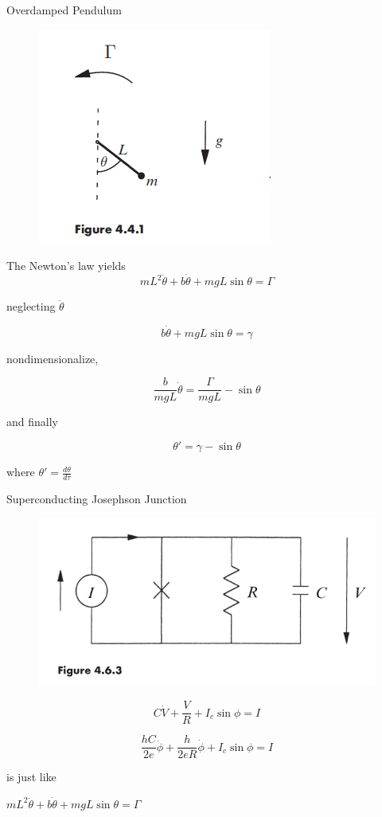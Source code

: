 \documentclass[9pt,aspectratio=43,mathserif,table]{beamer}
\begin{document}
\begin{frame}{Overdamped Pendulum}

  \begin{multicols}{2}
    \begin{figure}[!h]
      \centering
      \includegraphics[width=.2\textwidth]{fig/4.4.1.png}
    \end{figure}
    The Newton's law yields
    $$m L^2 \ddot \theta + b \dot\theta + mgL\sin\theta = \Gamma$$

    neglecting $\ddot\theta$

    $$b\dot \theta+ mgL\sin\theta = \gamma$$

    nondimensionalize, 

    $$\frac{ b}{mgL}\dot\theta = \frac{ \Gamma}{mgL} - \sin\theta$$

    and finally 

    $$\theta' = \gamma - \sin\theta$$

    where $\theta' = \frac{ d\theta}{d\tau}$
  \end{multicols}
 
\end{frame}
\begin{frame}{Superconducting Josephson Junction}
    \begin{figure}[!h]
      \centering
      \includegraphics[width=.5\textwidth]{fig/Josephson Junction}
    \end{figure}
 
$$C\dot V + \frac{ V}{R} + I_c\sin\phi = I$$

$$\frac{ hC}{2e} \ddot \phi+ \frac{ h}{2eR}\dot\phi + I_c\sin\phi = I$$

is just like 

$mL^2 \ddot \theta + b\dot\theta + mgL\sin\theta = \Gamma$

\end{frame}
\end{document}
